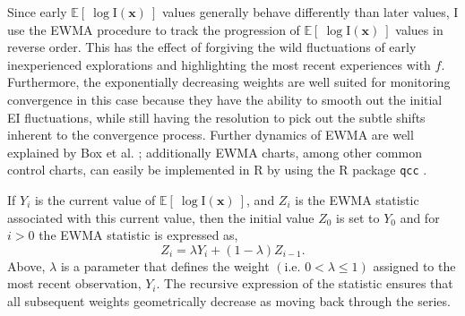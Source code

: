 \documentclass[12pt]{article}
\newcommand{\E}[1]{
        \mathbb{E}\left[~#1~\right]
}
\def \ix {
	\text{I}(\bm{x})
}
\begin{document}
	Since early $\E{\log\ix}$ values generally behave differently than later values, I use the EWMA procedure to track the progression of $\E{\log\ix}$ values in reverse order.
	This has the effect of forgiving the wild fluctuations of early inexperienced explorations and highlighting the most recent experiences with $f$. %
	Furthermore, the exponentially decreasing weights are well suited for monitoring convergence in this case because they have the ability to smooth out the initial EI fluctuations, while still having the resolution to pick out the subtle shifts inherent to the convergence process.
	Further dynamics of EWMA are well explained by Box et al. \cite{boxBook}; additionally EWMA charts, among other common control charts, can easily be implemented in R by using the R package \verb|qcc| \cite{qccPack}.

	
	If $Y_i$ is the current value of $\E{\log\ix}$, and $Z_i$ is the EWMA statistic associated with this current value, then the initial value $Z_0$ is set to $Y_0$ and for $i>0$ the EWMA statistic is expressed as,
	\begin{equation}
	Z_i=\lambda Y_i+(1-\lambda)Z_{i-1}.
	\label{ewmaStat}
	\end{equation}
	Above, $\lambda$ is a parameter that defines the weight $\left( \text{i.e. }0<\lambda\le1\right)$ assigned to the most recent observation, $Y_i$.
	The recursive expression of the statistic ensures that all subsequent weights geometrically decrease as moving back through the series.
	
	
\end{document}
